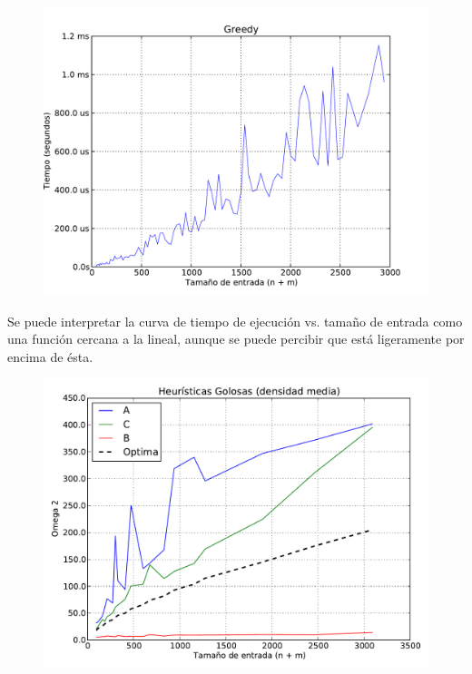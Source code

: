 \begin{figure}[H]
\begin{center}
\includegraphics[angle=0, scale=.75]{imagenes/tiempos_greedy_magic_A.pdf}
\label{grafico local}
\end{center}
\end{figure}

Se puede interpretar la curva de tiempo de ejecución vs. tamaño de entrada como una función cercana a la lineal, aunque se puede percibir
que está ligeramente por encima de ésta.

\begin{figure}[H]
\begin{center}
\includegraphics[angle=0, scale=.75]{imagenes/calidad_greedy_2014-06-27_09-50-48.pdf}
\label{grafico local}
\end{center}
\end{figure}

